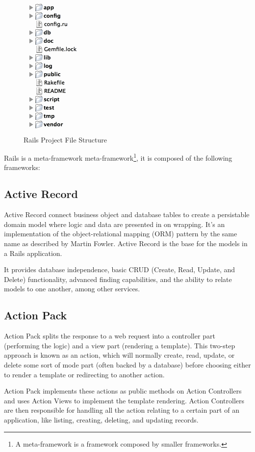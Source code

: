 \begin{figure}[h!]
  \caption{Rails Project File Structure}\label{fig:rails_file_structure}
  \centering
  \includegraphics[scale=0.75]{Images/rails_files}
\end{figure}

Rails is a meta-framework 
\textsf{meta-framework}\footnote{
  A meta-framework is a framework composed by smaller frameworks.
}, it is composed of the following frameworks:


\subsection{Active Record}
Active Record connect business object and database tables to create a persistable domain model where logic and data are presented in on wrapping. It’s an implementation of the object-relational mapping (ORM) pattern by the same name as described by Martin Fowler.
Active Record is the base for the models in a Rails application.

It provides database independence, basic CRUD (Create, Read, Update, and Delete) functionality, advanced finding capabilities, and the ability to relate models to one another, among other services.


\subsection{Action Pack} 
Action Pack splits the response to a web request into a controller part (performing the logic) and a view part (rendering a template). This two-step approach is known as an action, which will normally create, read, update, 
or delete some sort of mode part (often backed by a database) 
before choosing either to render a template or redirecting to another action.

Action Pack implements these actions as public methods on Action Controllers and uses Action Views to implement the template rendering. Action Controllers are then responsible for handling all the action relating to a certain part of an application, 
like listing, creating, deleting, and updating records.

